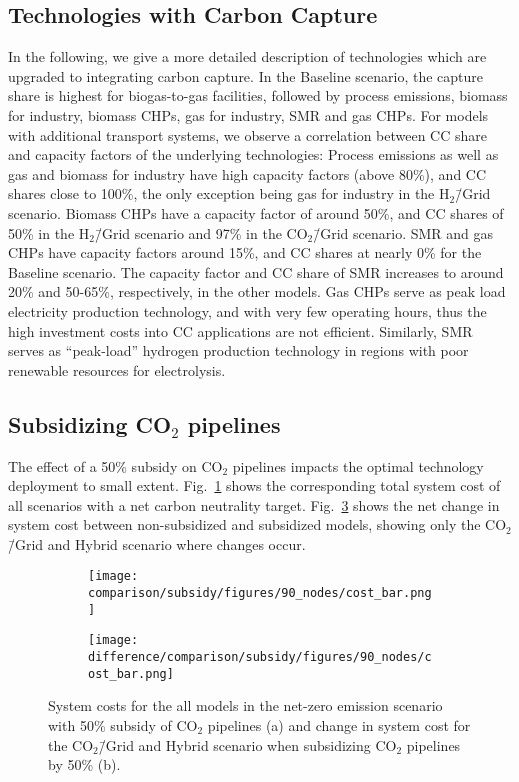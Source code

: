\documentclass[twocolumn]{article}
\newcommand{\carbon}{CO$_2$}
\newcommand{\carbongrid}{CO$_2$\=/Grid}
\newcommand{\baselinescenario}{Baseline scenario}
\newcommand{\carbonscenario}{CO$_2$\=/Grid scenario}
\newcommand{\hydrogenscenario}{H$_2$\=/Grid scenario}
\newcommand{\hybridscenario}{Hybrid scenario}
\begin{document}
\subsection{Technologies with Carbon Capture}

In the following, we give a more detailed description of technologies which are upgraded to integrating carbon capture.
In the \baselinescenario{}, the capture share is highest for biogas-to-gas facilities, followed by process emissions, biomass for industry, biomass CHPs, gas for industry, SMR and gas CHPs. For models with additional transport systems, we observe a correlation between CC share and capacity factors of the underlying technologies: Process emissions as well as gas and biomass for industry have high capacity factors (above 80\%), and CC shares close to 100\%, the only exception being gas for industry in the \hydrogenscenario{}. Biomass CHPs have a capacity factor of around 50\%, and CC shares of 50\% in the \hydrogenscenario{} and 97\% in the \carbonscenario{}. SMR and gas CHPs have capacity factors around 15\%, and CC shares at nearly 0\% for the \baselinescenario{}. The capacity factor and CC share of SMR increases to around 20\% and 50-65\%, respectively, in the other models. Gas CHPs serve as peak load electricity production technology, and with very few operating hours, thus the high investment costs into CC applications are not efficient. Similarly, SMR serves as ``peak-load'' hydrogen production technology in regions with poor renewable resources for electrolysis.


\subsection{Subsidizing \carbon{} pipelines}
\label{sec:subsidy}

The effect of a 50\% subsidy on \carbon{} pipelines impacts the optimal technology deployment to small extent. Fig.~\ref{fig:cost_bar_subsidy} shows the corresponding total system cost of all scenarios with a net carbon neutrality target. Fig.~\ref{fig:cost_bar_diff_subsidy} shows the net change in system cost between non-subsidized and subsidized models, showing only the \carbongrid{} and \hybridscenario{} where changes occur.

\begin{figure}[ht!]
    \centering
    \begin{subfigure}{.5\textwidth}
    \texttt{[image: comparison/subsidy/figures/90\_nodes/cost\_bar.png]}
    \caption{}
    \label{fig:cost_bar_subsidy}
\end{subfigure}%
\begin{subfigure}{.5\textwidth}
    \centering
    \texttt{[image: difference/comparison/subsidy/figures/90\_nodes/cost\_bar.png]}
    \caption{}
    \label{fig:cost_bar_diff_subsidy}
\end{subfigure}
\caption{System costs for the all models in the net-zero emission scenario with 50\% subsidy of \carbon{} pipelines (a) and change in system cost for the \carbongrid{} and \hybridscenario{} when subsidizing \carbon{} pipelines by 50\% (b).}
\end{figure}
\end{document}
